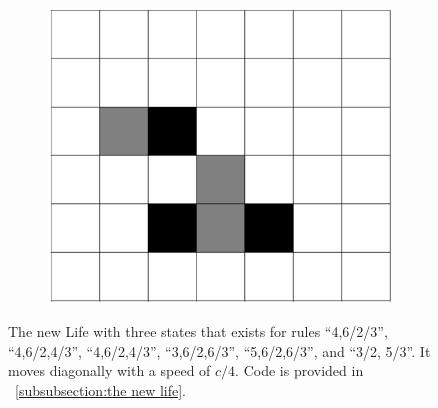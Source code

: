 \documentclass[12pt]{article}
\numberwithin{figure}{section} %
\begin{document}
\begin{figure}[H]
\begin{subfigure}{0.18\textwidth}
   	\end{subfigure}
        \begin{subfigure}{0.18\textwidth}
     	\centering
     	\includegraphics[width=\linewidth]{Section4/30.4}
     	\subcaption{}
   \end{subfigure}
   \caption[The new Life]{The new Life with three states that exists for rules “4,6/2/3”, “4,6/2,4/3”, “4,6/2,4/3”, “3,6/2,6/3”, “5,6/2,6/3”, and “3/2, 5/3”. It moves diagonally with a speed of $c/4$. Code is provided in ~\ref{subsubsection:the new life}.}
   \label{fig:the new life}
      \vspace{-1.5em}
\end{figure}
\end{document}
